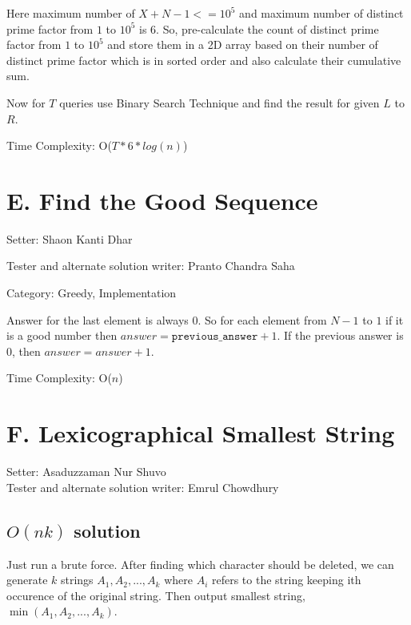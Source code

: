 \documentclass{article}
\begin{document}
Here maximum number of $X+N-1 <= 10^5$ and maximum number of distinct prime factor from $1$ to $10^5$  is $6$. So, pre-calculate the count of distinct prime factor from $1$ to $10^5$ and store them in a 2D array based on their number of distinct prime factor which  is in sorted order and also calculate their cumulative sum.

\noindent Now for $T$ queries use Binary Search Technique and find the result for given $L$ to $R$.

\vspace{0.5cm}

\noindent Time Complexity: O($T*6*log(n)$)

\section*{E. Find the Good Sequence}

\noindent Setter: Shaon Kanti Dhar

\noindent Tester and alternate solution writer: Pranto Chandra Saha

\noindent Category: Greedy, Implementation

\vspace{0.5cm}

Answer for the last element is always $0$. So for each element from $N-1$ to $1$ if it is a good number then $answer = \texttt{previous\_answer} + 1$. If the previous answer is $0$, then $answer = answer + 1$.

\vspace{0.5cm}

\noindent Time Complexity: O($n$)

\section*{F. Lexicographical Smallest String}

\noindent Setter: Asaduzzaman Nur Shuvo\\
\noindent Tester and alternate solution writer: Emrul Chowdhury

\subsection*{$O(nk)$ solution}
Just run a brute force. After finding which character should be deleted, we can generate $k$ strings $A_1,A_2,...,A_k$ where $A_i$ refers to the string keeping ith occurence of the original string. Then output smallest string, $\min(A_1,A_2,...,A_k)$.
\end{document}
